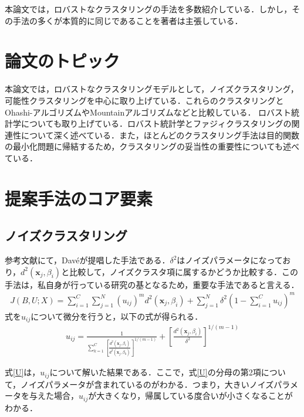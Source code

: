 \documentclass[10pt,onecolumn]{jsarticle}
\begin{document}
本論文では，ロバストなクラスタリングの手法を多数紹介している．しかし，その手法の多くが本質的に同じであることを著者は主張している．

\section{論文のトピック}
本論文では，ロバストなクラスタリングモデルとして，ノイズクラスタリング，可能性クラスタリングを中心に取り上げている．これらのクラスタリングとOhashi-アルゴリズムやMountainアルゴリズムなどと比較している．
ロバスト統計学についても取り上げている．ロバスト統計学とファジィクラスタリングの関連性について深く述べている．また，ほとんどのクラスタリング手法は目的関数の最小化問題に帰結するため，クラスタリングの妥当性の重要性についても述べている．

\section{提案手法のコア要素}
\subsection{ノイズクラスタリング}
参考文献\cite{thesis:noise_param}にて，Dav\'{e}が提唱した手法である．$\delta^{2}$はノイズパラメータになっており，$d^2(\bm{x}_j,\beta_i)$と比較して，ノイズクラスタ項に属するかどうか比較する．この手法は，私自身が行っている研究の基となるため，重要な手法であると言える．
\begin{align}
\label{function}
J(B, U ; X)= \sum_{i=1}^{C} \sum_{j=1}^{N}\left(u_{i j}\right)^{m} d^{2}\left(\bm{x}_{j}, \beta_{i}\right)
+\sum_{j=1}^{N} \delta^{2}\left(1-\sum_{i=1}^{C} u_{i j}\right)^{m}
\end{align}
式\label{function}を$u_{ij}$について微分を行うと，以下の式が得られる．
\begin{align}
	\label{U}
	u_{i j}=\frac{1}{\sum_{k=1}^{C}\left[\frac{d^{2}\left(\boldsymbol{x}_{j}, \beta_{i}\right)}{d^{2}\left(\boldsymbol{x}_{j}, \beta_{k}\right)}\right]^{1 /(m-1)}}+\left[\frac{d^{2}\left(\boldsymbol{x}_{j}, \beta_{i}\right)}{\delta^{2}}\right]^{1 /(m-1)}
\end{align}

式\eqref{U}は，$u_{ij}$について解いた結果である．ここで，式\eqref{U}の分母の第2項について，ノイズパラメータが含まれているのがわかる．つまり，大きいノイズパラメータを与えた場合，$u_{ij}$が大きくなり，帰属している度合いが小さくなることがわかる．
\end{document}
